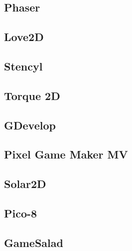 \subsection{Phaser}

\subsection{Love2D}

\subsection{Stencyl}

\subsection{Torque 2D}

\subsection{GDevelop}

\subsection{Pixel Game Maker MV}

\subsection{Solar2D}

\subsection{Pico-8}

\subsection{GameSalad}